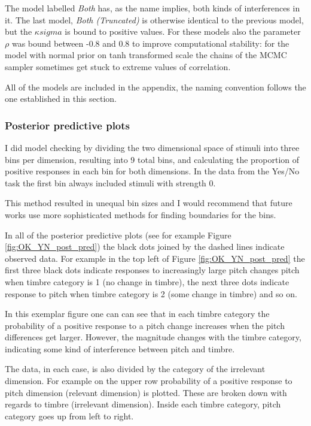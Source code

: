 \documentclass{article}\usepackage{knitr}
\begin{document}
The model labelled \textit{Both} has, as the name implies, both kinds of interferences in it. The last model, \textit{Both (Truncated)} is otherwise identical to the previous model, but the $\kappa{sigma}$ is bound to positive values. For these models also the parameter $\rho$ was bound between -0.8 and 0.8 to improve computational stability: for the model with normal prior on tanh transformed scale the chains of the MCMC sampler sometimes get stuck to extreme values of correlation.

All of the models are included in the appendix, the naming convention follows the one established in this section. 

\subsubsection{Posterior predictive plots}

I did model checking by dividing the two dimensional space of stimuli into three bins per dimension, resulting into 9 total bins, and calculating the proportion of positive responses in each bin for both dimensions. In the data from the Yes/No task the first bin always included stimuli with strength 0.

This method resulted in unequal bin sizes and I would recommend that future works use more sophisticated methods for finding boundaries for the bins. 

In all of the posterior predictive plots (see for example Figure \ref{fig:OK_YN_post_pred}) the black dots joined by the dashed lines indicate observed data. For example in the top left of Figure \ref{fig:OK_YN_post_pred} the first three black dots indicate responses to increasingly large pitch changes pitch when timbre category is 1 (no change in timbre), the next three dots indicate response to pitch when timbre category is 2 (some change in timbre) and so on. 

In this exemplar figure one can can see that in each timbre category the probability of a positive response to a pitch change increases when the pitch differences get larger. However, the magnitude changes with the timbre category, indicating some kind of interference between pitch and timbre.

The data, in each case, is also divided by the category of the irrelevant dimension. For example on the upper row probability of a positive response to pitch dimension (relevant dimension) is plotted. These are broken down with regards to timbre (irrelevant dimension). Inside each timbre category, pitch category goes up from left to right. 
\end{document}
